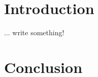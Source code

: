 \documentclass[11pt,a4paper]{article}
\begin{document}
\sdpfrontpage

\sdptableofcontents

\section{Introduction}

... write something! \citep{dewdney2009square}

\section{Conclusion}

\appendix


\sdplistoffigures
\sdplistoftables
{}
\end{document}
